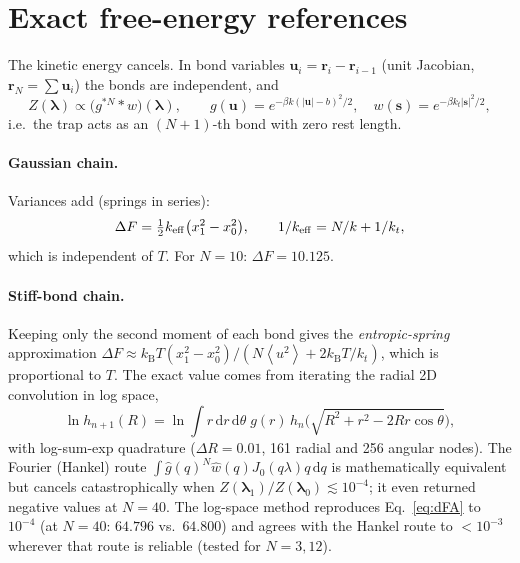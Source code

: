 \documentclass[11pt,a4paper]{article}
\newcommand{\kT}{k_{\mathrm B}T}
\newcommand{\dd}{\mathrm{d}}
\newcommand{\avg}[1]{\left\langle #1\right\rangle}
\newcommand{\lam}{\bm{\lambda}}
\begin{document}
\section{Exact free-energy references}
\label{sec:exact}

The kinetic energy cancels. In bond variables $\bm u_i=\bm r_i-\bm r_{i-1}$ (unit Jacobian,
$\bm r_N=\sum\bm u_i$) the bonds are independent, and
\begin{equation}
Z(\lam)\propto\big(g^{*N}*w\big)(\lam),\qquad g(\bm u)=e^{-\beta k(|\bm u|-b)^2/2},\quad
w(\bm s)=e^{-\beta k_t|\bm s|^2/2},
\label{eq:Zconv}
\end{equation}
i.e.\ the trap acts as an $(N{+}1)$-th bond with zero rest length.

\paragraph{Gaussian chain.} Variances add (springs in series):
\begin{equation}
\Delta F=\tfrac{1}{2}k_{\rm eff}\big(x_1^2-x_0^2\big),\qquad 1/k_{\rm eff}=N/k+1/k_t ,
\label{eq:dFA}
\end{equation}
which is independent of $T$. For $N=10$: $\Delta F=10.125$.

\paragraph{Stiff-bond chain.} Keeping only the second moment of each bond gives the
\emph{entropic-spring} approximation
$\Delta F\approx\kT(x_1^2-x_0^2)/(N\avg{u^2}+2\kT/k_t)$, which is proportional to $T$. The exact value comes from
iterating the radial 2D convolution in log space,
\begin{equation}
\ln h_{n+1}(R)=\ln\!\int r\,\dd r\,\dd\theta\;g(r)\,h_n\!\big(\sqrt{R^2+r^2-2Rr\cos\theta}\big),
\end{equation}
with log-sum-exp quadrature ($\Delta R=0.01$, 161 radial and 256 angular nodes). The Fourier
(Hankel) route $\int\hat g(q)^N\hat w(q)J_0(q\lambda)q\,\dd q$ is mathematically equivalent
but cancels catastrophically when $Z(\lam_1)/Z(\lam_0)\lesssim10^{-4}$; it even returned negative
values at $N=40$. The log-space method reproduces Eq.~\eqref{eq:dFA} to $10^{-4}$ (at $N=40$:
$64.796$ vs.\ $64.800$) and agrees with the Hankel route to $<10^{-3}$ wherever that route is
reliable (tested for $N=3,12$).
\end{document}
